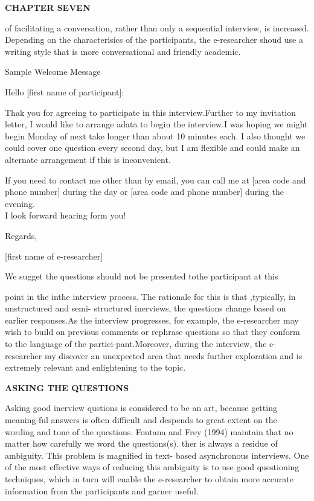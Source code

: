 \documentclass[a4paper]{book}
\begin{document}
\textbf{CHAPTER SEVEN}
\begin{flushleft}
of facilitating a conversation, rather than only a sequential interview, is increased. Depending on the characterisics of the participants, the e-researcher shoud use a writing style that is more conversational and friendly academic.
\begin{center}

Sample Welcome Message

\end{center}
Hello [first name of participant]:

 \vspace*{5mm}
 Thak you for agreeing to participate in this interview.Further to my invitation letter, I would like to arrange adata to begin the interview.I was hoping we might begin Monday of next take longer than about 10 minutes each. I also thought we could cover one question every second day, but I am flexible and could make an alternate arrangement if this is inconvenient.
 
 \vspace{5mm}
 If you need to contact me other than by email, you can call me at [area code and phone number] during the day or [area code and phone number] during the evening.\\
 I look forward hearing form you!
 
 \vspace{5mm}
 Regards,
 
 \vspace{3mm}
 [first name of e-researcher]
 
 \vspace{3mm}
 \begin{flushright}
  We sugget the questions should not be presented tothe participant at this \\
  \end{flushright}
 point in the inthe interview process. The rationale for this is that ,typically, in unstructured and semi- structured inerviews, the questions change based on earlier responses.As the interview progresses, for example, the e-researcher may wish to build on previous comments or rephrase questions so that they conform to the language of the partici-pant.Moreover, during the interview, the e-researcher my discover an unexpected area that needs further exploration and is extremely relevant and enlightening to the topic.
 
 \vspace{5mm}
 \textbf{ASKING THE QUESTIONS}
 
 \vspace{3mm}
 Asking good inerview qustions is considered to be an art, because getting meaning-ful answers is often difficult and despends to great extent on the wording and tone of the questions. Fontana and Frey (1994) maintain that no matter how carefully we word the questions(s). ther is always a residue of ambiguity. This problem is magnified in text- based asynchronous interviews. One of the most effective ways of reducing this ambiguity is to use good questioning techniques, which in turn will enable the e-researcher to obtain more accurate information from the participants and garner useful.
 \end{flushleft}
\end{document}
